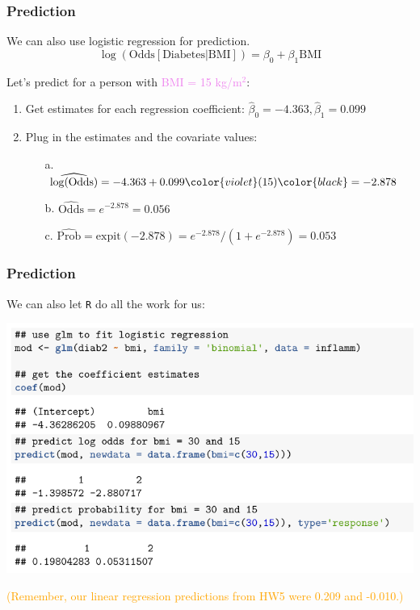 \documentclass[12pt, 
hyperref={colorlinks=true, linkcolor=blue, urlcolor=cyan}]{beamer}
\begin{document}
\begin{frame}
\frametitle{Prediction}
We can also use logistic regression for prediction. $$\log\left(\text{Odds}[\text{Diabetes}| \text{BMI}]\right) = \beta_0 + \beta_1\text{BMI}$$

Let's predict for a person with \textcolor{violet}{BMI = 15 kg/m$^2$}:

\begin{enumerate}
\item Get estimates for each regression coefficient: $\hat\beta_0 = -4.363, \hat\beta_1 = 0.099$
\item Plug in the estimates and the covariate values:
	\begin{itemize}
	\item[a.] $\widehat{\log(\text{Odds})} = -4.363 + 0.099\color{violet}(15) \color{black} = -2.878$
	\item[b.] $\widehat{\text{Odds}} = e^{-2.878} = 0.056$
	\item[c.] $\widehat{\text{Prob}} = \text{expit}(-2.878) = e^{-2.878}/(1+e^{-2.878})= 0.053$
	\end{itemize}
\end{enumerate}
\end{frame}

\begin{frame}
\frametitle{Prediction}

We can also let \texttt{R} do all the work for us:

\includegraphics[width=\textwidth]{figs/inflamm_predict}
\pause
\begin{scriptsize}
\textcolor{orange}{(Remember, our linear regression predictions from HW5 were 0.209 and -0.010.)}
\end{scriptsize}

\end{frame}
\end{document}
